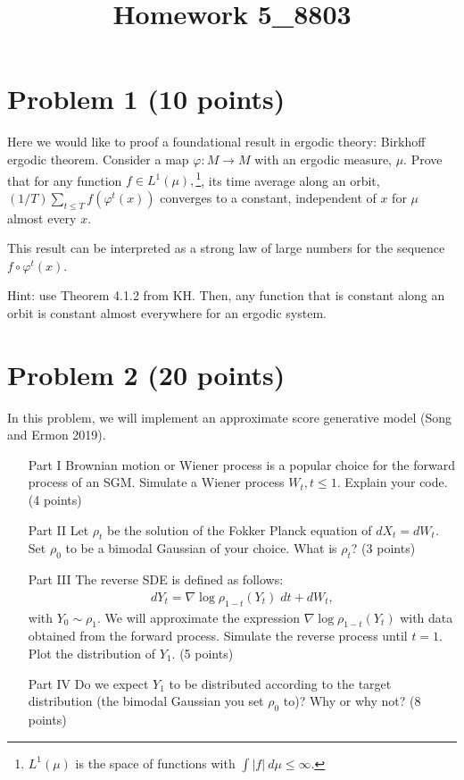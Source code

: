\documentclass[12pt]{article}
\title{Homework 5_8803}
\begin{document}
\MakeScribeTop
\section{Problem 1 (10 points)}
Here we would like to proof a foundational result in ergodic theory: Birkhoff ergodic theorem. Consider a map $\varphi: M \to M$ with an ergodic measure, $\mu$. Prove that for any function $f \in L^1(\mu),$\footnote{$L^1(\mu)$ is the space of functions with $\int |f| \: d\mu \leq \infty.$}, its time average along an orbit, $(1/T) \sum_{t\leq T} f(\varphi^t(x))$ converges to a constant, independent of $x$ for $\mu$ almost every $x.$ 

This result can be interpreted as a strong law of large numbers for the sequence $f\circ\varphi^t(x)$.

Hint: use Theorem 4.1.2 from KH. Then, any function that is constant along an orbit is constant almost everywhere for an ergodic system. 


\section{Problem 2 (20 points)}

In this problem, we will implement an approximate score generative model (Song and Ermon 2019). 
\begin{itemize}
	\item[Part I] Brownian motion or Wiener process is a popular choice for the forward process of an SGM. Simulate a Wiener process $W_t, t\leq 1.$ Explain your code. (4 points)
	\item[Part II] Let $\rho_t$ be the solution of the Fokker Planck equation of $dX_t = dW_t.$ Set $\rho_0$ to be a bimodal Gaussian of your choice. What is $\rho_t$? (3 points)
	\item[Part III] The reverse SDE is defined as follows:
		\begin{align}
			dY_t = \nabla \log \rho_{1-t}(Y_t) \; dt + dW_t,
		\end{align}
		with $Y_0 \sim \rho_1.$ We will approximate the expression $\nabla \log \rho_{1-t}(Y_t)$ with data obtained from the forward process. Simulate the reverse process until $t=1.$ Plot the distribution of $Y_1$. (5 points)
	\item[Part IV] Do we expect $Y_1$ to be distributed according to the target distribution (the bimodal Gaussian you set $\rho_0$ to)? Why or why not? (8 points)

\end{itemize}
\end{document}
